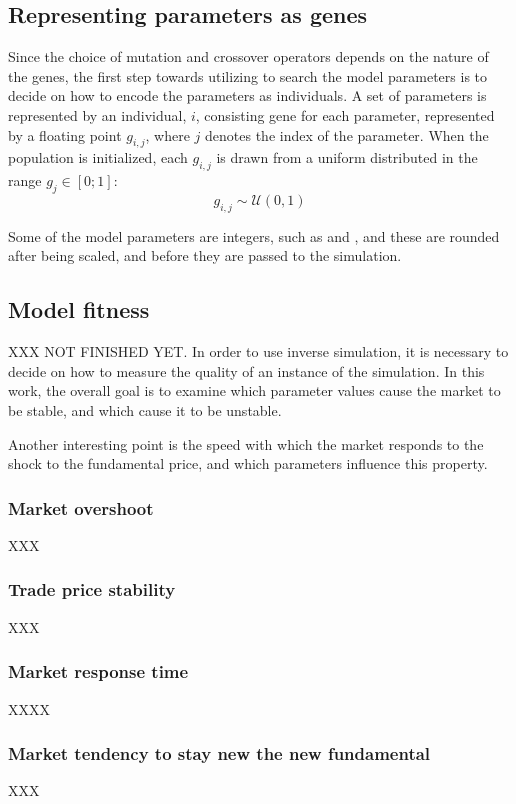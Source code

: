 \subsection{Representing parameters as genes}
Since the choice of mutation and crossover operators depends on the nature of the genes, the first step towards utilizing to search the model parameters is to decide on how to encode the parameters as individuals. 
A set of parameters is represented by an individual, $i$, consisting gene for each parameter, represented by a floating point $g_{i,j}$, where $j$ denotes the index of the parameter. When the population is initialized, each $g_{i,j}$ is drawn from a uniform distributed in the range $g_j \in [0;1]$:
\begin{equation}
g_{i,j} \sim \mathcal{U}(0,1)
\end{equation}

Some of the model parameters are integers, such as \ssmmnAgents{} and \scnAgents{}, and these are rounded after being scaled, and before they are passed to the simulation.





\subsection{Model fitness}\label{section:simulation_fitness}
XXX NOT FINISHED YET. 
In order to use inverse simulation, it is necessary to decide on how to measure the quality of an instance of the simulation. In this work, the overall goal is to examine which parameter values cause the market to be stable, and which cause it to be unstable. 


Another interesting point is the speed with which the market responds to the shock to the fundamental price, and which parameters influence this property.  

\subsubsection{Market overshoot}
XXX
\subsubsection{Trade price stability}
XXX
\subsubsection{Market response time}
XXXX
\subsubsection{Market tendency to stay new the new fundamental}
XXX


